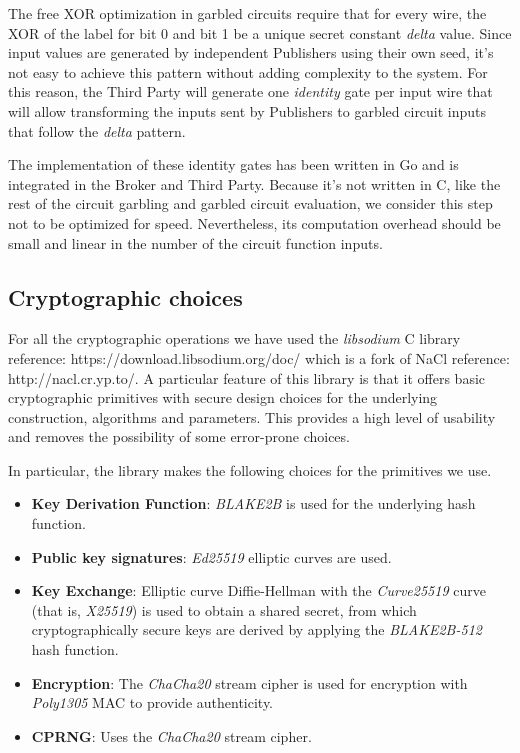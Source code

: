 The free XOR optimization in garbled circuits require that for every wire, the
XOR of the label for bit 0 and bit 1 be a unique secret constant \emph{delta}
value.  Since input values are generated by independent Publishers using their
own seed, it's not easy to achieve this pattern without adding complexity to
the system.  For this reason, the Third Party will generate one \emph{identity}
gate per input wire that will allow transforming the inputs sent by Publishers
to garbled circuit inputs that follow the \emph{delta} pattern.

The implementation of these identity gates has been written in Go and is
integrated in the Broker and Third Party.  Because it's not written in C, like
the rest of the circuit garbling and garbled circuit evaluation, we consider
this step not to be optimized for speed.  Nevertheless, its computation
overhead should be small and linear in the number of the circuit function
inputs.


\subsection{Cryptographic choices}

For all the cryptographic operations we have used the \emph{libsodium} C
library {reference: https://download.libsodium.org/doc/} which is a fork of
NaCl {reference: http://nacl.cr.yp.to/}.  A particular feature of this library
is that it offers basic cryptographic primitives with secure design choices
for the underlying construction, algorithms and parameters.  This provides a
high level of usability and removes the possibility of some error-prone
choices.

In particular, the library makes the following choices for the primitives we use.

\begin{itemize}
  \item \textbf{Key Derivation Function}: \emph{BLAKE2B} is used for the
    underlying hash function.
  \item \textbf{Public key signatures}: \emph{Ed25519} elliptic curves are used.
  \item \textbf{Key Exchange}: Elliptic curve Diffie-Hellman with the
    \emph{Curve25519} curve (that is, \emph{X25519}) is used to obtain a shared
    secret, from which cryptographically secure keys are derived by applying
    the \emph{BLAKE2B-512} hash function.
  \item \textbf{Encryption}: The \emph{ChaCha20} stream cipher is used for
    encryption with \emph{Poly1305} MAC to provide authenticity.
  \item \textbf{CPRNG}: Uses the \emph{ChaCha20} stream cipher.
\end{itemize}

